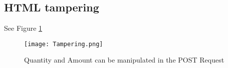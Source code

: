 \documentclass[
	letterpaper, %
	10pt, %
	unnumberedsections, %
	twoside, %
]{APAAssignment}
\begin{document}
\begin{appendices}
\subsection{HTML tampering}
See Figure \ref{fig:app:Tampering}
\begin{figure}[!htp] %
	\centering
	\texttt{[image: Tampering.png]}
	\caption{Quantity and Amount can be manipulated in the POST Request}
	\label{fig:app:Tampering}
\end{figure}




\end{appendices}
\end{document}
